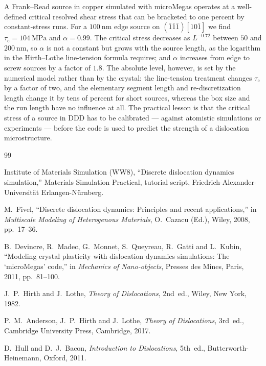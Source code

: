 \documentclass[11pt,a4paper]{article}
\numberwithin{equation}{section}
\theoremstyle{remark}
\newcommand{\tauc}{\tau_{\mathrm{c}}}
\begin{document}
A Frank--Read source in copper simulated with microMegas operates at a well-defined critical resolved
shear stress that can be bracketed to one percent by constant-stress runs. For a
$\SI{100}{\nano\metre}$ edge source on $(\bar1\bar1\bar1)[10\bar1]$ we find
$\tauc = \SI{104}{\mega\pascal}$ and $\alpha = 0.99$. The critical stress decreases as $L^{-0.72}$
between $50$ and $\SI{200}{\nano\metre}$, so $\alpha$ is not a constant but grows with the source length,
as the logarithm in the Hirth--Lothe line-tension formula requires; and $\alpha$ increases from edge to
screw sources by a factor of $1.8$. The absolute level, however, is set by the numerical model rather
than by the crystal: the line-tension treatment changes $\tauc$ by a factor of two, and the
elementary segment length and re-discretization length change it by tens of percent for short sources,
whereas the box size and the run length have no influence at all. The practical lesson is that
the critical stress of a source in DDD has to be calibrated --- against atomistic simulations or
experiments --- before the code is used to predict the strength of a dislocation microstructure.

\begin{thebibliography}{99}

Institute of Materials Simulation (WW8),
``Discrete dislocation dynamics simulation,''
Materials Simulation Practical, tutorial script,
Friedrich-Alexander-Universit\"at Erlangen-N\"urnberg.

M.~Fivel,
``Discrete dislocation dynamics: Principles and recent applications,''
in \textit{Multiscale Modeling of Heterogenous Materials}, O.~Cazacu (Ed.),
Wiley, 2008, pp.~17--36.

B.~Devincre, R.~Madec, G.~Monnet, S.~Queyreau, R.~Gatti and L.~Kubin,
``Modeling crystal plasticity with dislocation dynamics simulations: The `microMegas' code,''
in \textit{Mechanics of Nano-objects}, Presses des Mines, Paris, 2011, pp.~81--100.

J.~P.~Hirth and J.~Lothe,
\textit{Theory of Dislocations},
2nd~ed., Wiley, New York, 1982.

P.~M.~Anderson, J.~P.~Hirth and J.~Lothe,
\textit{Theory of Dislocations},
3rd~ed., Cambridge University Press, Cambridge, 2017.

D.~Hull and D.~J.~Bacon,
\textit{Introduction to Dislocations},
5th~ed., Butterworth-Heinemann, Oxford, 2011.

\end{thebibliography}
\end{document}
